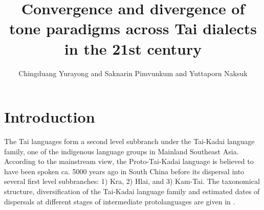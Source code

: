 \documentclass[output=paper]{langscibook}
\author{Chingduang Yurayong\orcid{}\affiliation{University of Helsinki; Mahidol University} and Saknarin Pimvunkum\affiliation{Mahidol University} and Yuttaporn Naksuk\affiliation{Mahidol University}}
\title[Convergence and divergence of tone paradigms across Tai dialects]
      {Convergence and divergence of tone paradigms across Tai dialects in the 21st century}
\begin{document}
\graphicspath{{figures/yurayong}}
\maketitle 
\label{chap:yurayong}

\section{Introduction}
\label{sec:yurayong:1}
The Tai languages form a second level subbranch under the Tai-Kadai language family, one of the indigenous language groups in Mainland Southeast Asia. According to the mainstream view, the Proto-Tai-Kadai language is believed to have been spoken ca. 5000 years ago in South China \citep[126]{Ostapirat2005} before its dispersal into several first level subbranches: 1) Kra, 2) Hlai, and 3) Kam-Tai. The taxonomical structure, diversification of the Tai-Kadai language family and estimated dates of dispersals at different stages of intermediate protolanguages are given in .
\end{document}
